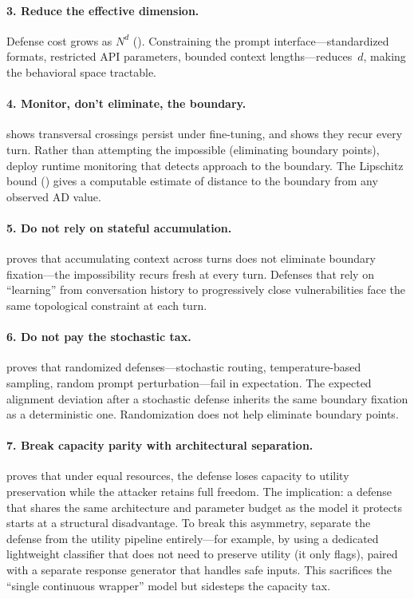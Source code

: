 \documentclass[11pt]{article}
\begin{document}
\paragraph{3. Reduce the effective dimension.}
Defense cost grows as $N^d$ (). Constraining the prompt
interface---standardized formats, restricted API parameters, bounded
context lengths---reduces~$d$, making the behavioral space tractable.

\paragraph{4. Monitor, don't eliminate, the boundary.}
 shows transversal crossings persist under
fine-tuning, and  shows they recur every turn.
Rather than attempting the impossible (eliminating boundary points),
deploy runtime monitoring that detects approach to the boundary. The
Lipschitz bound () gives a computable estimate of
distance to the boundary from any observed AD value.

\paragraph{5. Do not rely on stateful accumulation.}
 proves that accumulating context across turns
does not eliminate boundary fixation---the impossibility recurs fresh
at every turn. Defenses that rely on ``learning'' from conversation
history to progressively close vulnerabilities face the same
topological constraint at each turn.

\paragraph{6. Do not pay the stochastic tax.}
 proves that randomized defenses---stochastic
routing, temperature-based sampling, random prompt perturbation---fail
in expectation. The expected alignment deviation after a stochastic
defense inherits the same boundary fixation as a deterministic one.
Randomization does not help eliminate boundary points.

\paragraph{7. Break capacity parity with architectural separation.}
 proves that under equal resources, the defense
loses capacity to utility preservation while the attacker retains full
freedom. The implication: a defense that shares the same architecture
and parameter budget as the model it protects starts at a structural
disadvantage. To break this asymmetry, separate the defense from the
utility pipeline entirely---for example, by using a dedicated
lightweight classifier that does not need to preserve utility (it only
flags), paired with a separate response generator that handles safe
inputs. This sacrifices the ``single continuous wrapper'' model but
sidesteps the capacity tax.
\end{document}
